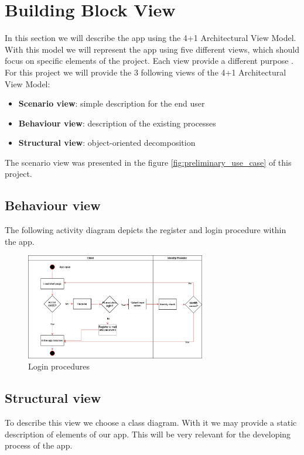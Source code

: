 \section{Building Block View}

In this section we will describe the \gls{app} using the 4+1 Architectural View Model. With this model we will represent
the \gls{app} using five different views, which should focus on specific elements of the project. Each view provide
a different purpose \cite{refart:KR41}. For this project we will provide the 3 following views of the 4+1 Architectural View 
Model:

\begin{itemize}
    \item \textbf{Scenario view}: simple description for the end user 
    \item \textbf{Behaviour view}: description of the existing processes
    \item \textbf{Structural view}: object-oriented decomposition
\end{itemize}

The scenario view was presented in the figure \ref{fig:preliminary_use_case} of this project.

\subsection{Behaviour view}
The following \gls{activity diagram} depicts the register and login procedure within the app.

\begin{figure}[H]
    \centering
    \includegraphics[width=0.7\textwidth]{assets/login_AC.jpg}
    \caption{Login procedures}
    \label{fig:login_register}
\end{figure}

\subsection{Structural view}
To describe this view we choose a \gls{class diagram}. With it we may provide a static description of elements
of our app. This will be very relevant for the developing process of the \gls{app}.

